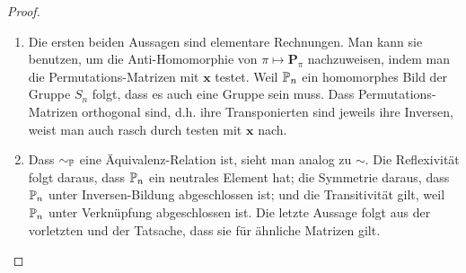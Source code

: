                 \begin{proof}

                    \begin{enumerate}[
                        label = \texttt{ad} \arabic*.,
                        wide,
                        labelindent = 0pt
                    ]

                        \item Die ersten beiden Aussagen sind elementare Rechnungen.
                        Man kann sie benutzen, um die Anti-Homomorphie von $\pi \mapsto \mathbf P_\pi$ nachzuweisen, indem man die Permutations-Matrizen mit $\mathbf x$ testet.
                        Weil $\P_n$ ein homomorphes Bild der Gruppe $S_n$ folgt, dass es auch eine Gruppe sein muss.
                        Dass Permutations-Matrizen orthogonal sind, d.h. ihre Transponierten sind jeweils ihre Inversen, weist man auch rasch durch testen mit $\mathbf x$ nach.

                        \item Dass $\sim_{\P}$ eine Äquivalenz-Relation ist, sieht man analog zu $\sim$.
                        Die Reflexivität folgt daraus, dass $\P_n$ ein neutrales Element hat;
                        die Symmetrie daraus, dass $\P_n$ unter Inversen-Bildung abgeschlossen ist;
                        und die Transitivität gilt, weil $\P_n$ unter Verknüpfung abgeschlossen ist.
                        Die letzte Aussage folgt aus der vorletzten und der Tatsache, dass sie für ähnliche Matrizen gilt.

                    \end{enumerate}

                \end{proof}

